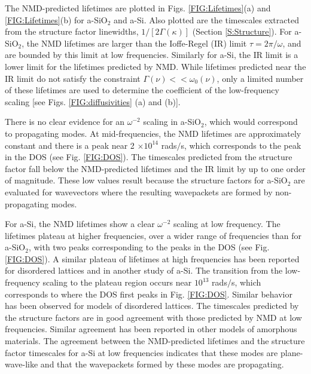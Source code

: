 \documentclass[aps,prb,twocolumn,superscriptaddress,footinbib,amsmath,amssymb,floatfix]{revtex4}
\begin{document}
The NMD-predicted lifetimes are plotted in Figs. 
\ref{FIG:Lifetimes}(a) and \ref{FIG:Lifetimes}(b) 
for a-SiO$_2$ and a-Si. 
Also plotted are the timescales extracted from the structure 
factor linewidths, $1/[2\Gamma(\kappa)]$ (Section \ref{S:Structure}). 
For a-SiO$_2$, the NMD lifetimes are larger than 
the Ioffe-Regel (IR) limit $\tau = 2\pi/\omega$,
\cite{taraskin_determination_1999} and are bounded by  
this limit at low frequencies. Similarly for a-Si, the IR limit is 
a lower limit for the lifetimes predicted by NMD. 
While lifetimes 
predicted near the IR limit do not satisfy the constraint 
$\Gamma(\nu) << \omega_0(\nu)$, only a limited number of these 
lifetimes are used to determine the coefficient of the low-frequency 
scaling [see Figs. \ref{FIG:diffusivities} (a) and (b)]. 

There is no clear evidence for an $\omega^{-2}$ scaling in a-SiO$_2$, 
which would correspond to propagating modes.  
At mid-frequencies, the NMD lifetimes are approximately constant and  
there is a peak near 2 $\times 10^{14}$ rads$/$s, which corresponds to 
the peak in the DOS (see Fig. \ref{FIG:DOS}). 
The timescales predicted from the 
structure factor fall below the NMD-predicted lifetimes 
and the IR limit by up to one order of magnitude. 
These low values result because the structure factors 
for a-SiO$_2$ are evaluated for wavevectors where the resulting 
wavepackets are formed by non-propagating modes.
\cite{feldman_thermal_1993,feldman_numerical_1999}

For a-Si, the NMD lifetimes show a clear $\omega^{-2}$ 
scaling at low frequency. 
The lifetimes plateau at higher frequencies,
over a wider range of frequencies than for a-SiO$_2$, with two peaks 
corresponding to the peaks in the DOS (see Fig. \ref{FIG:DOS}). 
A similar plateau of lifetimes at high frequencies has been 
reported for disordered lattices
\cite{sheng_heat_1991,larkin_predicting_2013} and in 
another study of a-Si.\cite{he_heat_2011} 
The transition from the low-frequency scaling to 
the plateau region occurs near 
$10^{13}$ rads$/$s, which corresponds to where the DOS first peaks 
in Fig. \ref{FIG:DOS}. 
Similar behavior has been observed for models of disordered lattices.
\cite{larkin_predicting_2013} The timescales predicted by the 
structure factors are in good agreement with those predicted by NMD 
at low frequencies. Similar agreement has been reported in other 
models of amorphous materials.
\cite{mazzacurati_low-frequency_1996,bickham_calculation_1998,
bickham_numerical_1999,feldman_numerical_1999} 
The agreement between the 
NMD-predicted lifetimes and the structure factor timescales for a-Si 
at low frequencies indicates that these modes are plane-wave-like 
and that the wavepackets formed by these modes are propagating.
\cite{feldman_thermal_1993,feldman_numerical_1999}
\end{document}
